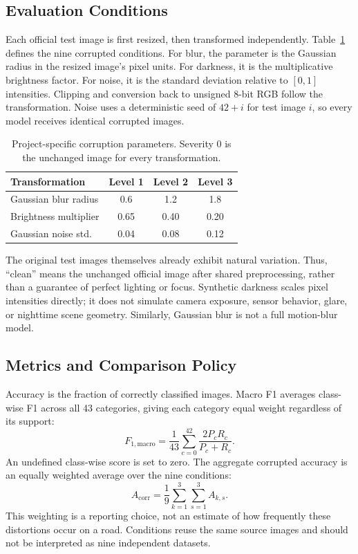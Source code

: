 \documentclass[conference]{IEEEtran}
\begin{document}
\subsection{Evaluation Conditions}
Each official test image is first resized, then transformed independently. Table~\ref{tab:conditions} defines the nine corrupted conditions. For blur, the parameter is the Gaussian radius in the resized image's pixel units. For darkness, it is the multiplicative brightness factor. For noise, it is the standard deviation relative to $[0,1]$ intensities. Clipping and conversion back to unsigned 8-bit RGB follow the transformation. Noise uses a deterministic seed of $42+i$ for test image $i$, so every model receives identical corrupted images.

\begin{table}[t]\centering
\caption{Project-specific corruption parameters. Severity 0 is the unchanged image for every transformation.}\label{tab:conditions}
\begin{tabular}{lccc}\toprule
Transformation & Level 1 & Level 2 & Level 3\\\midrule
Gaussian blur radius & 0.6 & 1.2 & 1.8\\
Brightness multiplier & 0.65 & 0.40 & 0.20\\
Gaussian noise std. & 0.04 & 0.08 & 0.12\\\bottomrule
\end{tabular}\end{table}

The original test images themselves already exhibit natural variation. Thus, ``clean'' means the unchanged official image after shared preprocessing, rather than a guarantee of perfect lighting or focus. Synthetic darkness scales pixel intensities directly; it does not simulate camera exposure, sensor behavior, glare, or nighttime scene geometry. Similarly, Gaussian blur is not a full motion-blur model.

\subsection{Metrics and Comparison Policy}
Accuracy is the fraction of correctly classified images. Macro F1 averages class-wise F1 across all 43 categories, giving each category equal weight regardless of its support:
\begin{equation}
F_{1,\mathrm{macro}}=\frac1{43}\sum_{c=0}^{42}\frac{2P_cR_c}{P_c+R_c}.
\end{equation}
An undefined class-wise score is set to zero. The aggregate corrupted accuracy is an equally weighted average over the nine conditions:
\begin{equation}
A_{\mathrm{corr}}=\frac19\sum_{k=1}^{3}\sum_{s=1}^{3}A_{k,s}.
\end{equation}
This weighting is a reporting choice, not an estimate of how frequently these distortions occur on a road. Conditions reuse the same source images and should not be interpreted as nine independent datasets.
\end{document}
